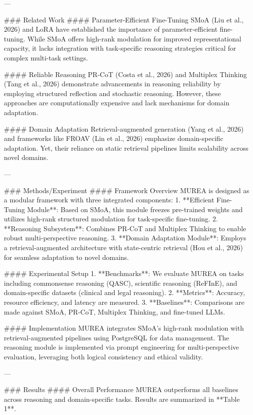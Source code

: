 ---

### Related Work  
#### Parameter-Efficient Fine-Tuning  
SMoA (Liu et al., 2026) and LoRA have established the importance of parameter-efficient fine-tuning. While SMoA offers high-rank modulation for improved representational capacity, it lacks integration with task-specific reasoning strategies critical for complex multi-task settings.

#### Reliable Reasoning  
PR-CoT (Costa et al., 2026) and Multiplex Thinking (Tang et al., 2026) demonstrate advancements in reasoning reliability by employing structured reflection and stochastic reasoning. However, these approaches are computationally expensive and lack mechanisms for domain adaptation.

#### Domain Adaptation  
Retrieval-augmented generation (Yang et al., 2026) and frameworks like FROAV (Lin et al., 2026) emphasize domain-specific adaptation. Yet, their reliance on static retrieval pipelines limits scalability across novel domains.

---

### Methods/Experiment  
#### Framework Overview  
MUREA is designed as a modular framework with three integrated components:  
1. **Efficient Fine-Tuning Module**: Based on SMoA, this module freezes pre-trained weights and utilizes high-rank structured modulation for task-specific fine-tuning.  
2. **Reasoning Subsystem**: Combines PR-CoT and Multiplex Thinking to enable robust multi-perspective reasoning.  
3. **Domain Adaptation Module**: Employs a retrieval-augmented architecture with state-centric retrieval (Hou et al., 2026) for seamless adaptation to novel domains.

#### Experimental Setup  
1. **Benchmarks**: We evaluate MUREA on tasks including commonsense reasoning (QASC), scientific reasoning (ReFInE), and domain-specific datasets (clinical and legal reasoning).  
2. **Metrics**: Accuracy, resource efficiency, and latency are measured.  
3. **Baselines**: Comparisons are made against SMoA, PR-CoT, Multiplex Thinking, and fine-tuned LLMs.

#### Implementation  
MUREA integrates SMoA's high-rank modulation with retrieval-augmented pipelines using PostgreSQL for data management. The reasoning module is implemented via prompt engineering for multi-perspective evaluation, leveraging both logical consistency and ethical validity.

---

### Results  
#### Overall Performance  
MUREA outperforms all baselines across reasoning and domain-specific tasks. Results are summarized in **Table 1**.

